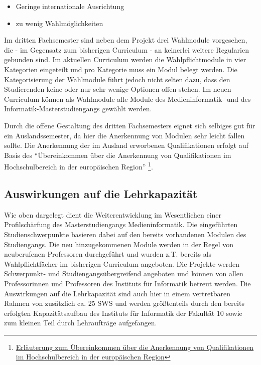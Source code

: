 \begin{itemize}
\tightlist
\item
  Geringe internationale Ausrichtung
\item
  zu wenig Wahlmöglichkeiten
\end{itemize}

Im dritten Fachsemester sind neben dem Projekt drei Wahlmodule
vorgesehen, die - im Gegensatz zum bisherigen Curriculum - an keinerlei
weitere Regularien gebunden sind. Im aktuellen Curriculum werden die
Wahlpflichtmodule in vier Kategorien eingeteilt und pro Kategorie muss
ein Modul belegt werden. Die Kategorisierung der Wahlmodule führt jedoch
nicht selten dazu, dass den Studierenden keine oder nur sehr wenige
Optionen offen stehen. Im neuen Curriculum können als Wahlmodule alle
Module des Medieninformatik- und des Informatik-Masterstudiengangs
gewählt werden.

Durch die offene Gestaltung des dritten Fachsemesters eignet sich
selbiges gut für ein Auslandssemester, da hier die Anerkennung von
Modulen sehr leicht fallen sollte. Die Anerkennung der im Ausland
erworbenen Qualifikationen erfolgt auf Basis des ``Übereinkommen über
die Anerkennung von Qualifikationen im Hochschulbereich in der
europäischen Region'' \footnote{\href{https://de.wikipedia.org/wiki/\%C3\%9Cbereinkommen_\%C3\%BCber_die_Anerkennung_von_Qualifikationen_im_Hochschulbereich_in_der_europ\%C3\%A4ischen_Region}{Erläuterung
  zum Übereinkommen über die Anerkennung von Qualifikationen im
  Hochschulbereich in der europäischen Region}}.

\subsection{Auswirkungen auf die
Lehrkapazität\label{/mi-2017/selbstbericht/0150-soll-zustand-geplante-veraenderungen/0000-geplante-veraenderungen-bachelor}}\label{auswirkungen-auf-die-lehrkapazituxe4tpathlabelmi-2017selbstbericht0150-soll-zustand-geplante-veraenderungen0000-geplante-veraenderungen-bachelor-1}

Wie oben dargelegt dient die Weiterentwicklung im Wesentlichen einer
Profilschärfung des Masterstudiengangs Medieninformatik. Die
eingeführten Studienschwerpunkte basieren dabei auf den bereits
vorhandenen Modulen des Studiengangs. Die neu hinzugekommenen Module
werden in der Regel von neuberufenen Professoren durchgeführt und wurden
z.T. bereits als Wahlpflichtfächer im bisherigen Curriculum angeboten.
Die Projekte werden Schwerpunkt- und Studiengangsübergreifend angeboten
und können von allen Professorinnen und Professoren des Instituts für
Informatik betreut werden. Die Auswirkungen auf die Lehrkapazität sind
auch hier in einem vertretbaren Rahmen von zusätzlich ca. 25 SWS und
werden größtenteils durch den bereits erfolgten Kapazitätsaufbau des
Instituts für Informatik der Fakultät 10 sowie zum kleinen Teil durch
Lehraufträge aufgefangen.

